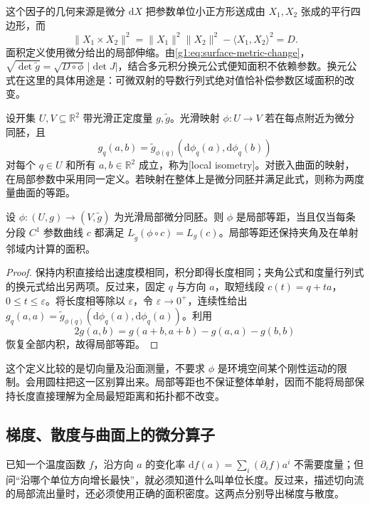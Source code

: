 这个因子的几何来源是微分 \(\mathrm{d}X\) 把参数单位小正方形送成由 \(X_1,X_2\) 张成的平行四边形，而
\[
	\|X_1\times X_2\|^2=\|X_1\|^2\|X_2\|^2-\langle X_1,X_2\rangle^2=D.
\]
面积定义使用微分给出的局部伸缩。由\eqref{g1:eq:surface-metric-change}，\(\sqrt{\det\widetilde g}=\sqrt{D\circ\phi}\,|\det J|\)，结合多元积分换元公式便知面积不依赖参数。换元公式在这里的具体用途是：可微双射的导数行列式绝对值恰补偿参数区域面积的改变。

\begin{definition}\label{g1:def:surface-local-isometry}
	设开集 \(U,V\subseteq\mathbb R^2\) 带光滑正定度量 \(g,\widetilde g\)。光滑映射 \(\phi:U\rightarrow V\) 若在每点附近为微分同胚，且
	\[
		g_q(a,b)=\widetilde g_{\phi(q)}(\mathrm{d}\phi_q(a),\mathrm{d}\phi_q(b))
	\]
	对每个 \(q\in U\) 和所有 \(a,b\in\mathbb R^2\) 成立，称为[local isometry]。对嵌入曲面的映射，在局部参数中采用同一定义。若映射在整体上是微分同胚并满足此式，则称为两度量曲面的等距。
\end{definition}

\begin{proposition}\label{g1:prop:local-isometry-length}
	设 \(\phi:(U,g)\rightarrow(V,\widetilde g)\) 为光滑局部微分同胚。则 \(\phi\) 是局部等距，当且仅当每条分段 \(C^1\) 参数曲线 \(c\) 都满足 \(L_{\widetilde g}(\phi\circ c)=L_g(c)\)。局部等距还保持夹角及在单射邻域内计算的面积。
\end{proposition}

\begin{proof}
	保持内积直接给出速度模相同，积分即得长度相同；夹角公式和度量行列式的换元式给出另两项。反过来，固定 \(q\) 与方向 \(a\)，取短线段 \(c(t)=q+ta\)，\(0\le t\le\varepsilon\)。将长度相等除以 \(\varepsilon\)，令 \(\varepsilon\to0^+\)，连续性给出 \(g_q(a,a)=\widetilde g_{\phi(q)}(\mathrm{d}\phi_q(a),\mathrm{d}\phi_q(a))\)。利用
	\[
		2g(a,b)=g(a+b,a+b)-g(a,a)-g(b,b)
	\]
	恢复全部内积，故得局部等距。
\end{proof}

这个定义比较的是切向量及沿面测量，不要求 \(\phi\) 是环境空间某个刚性运动的限制。会用圆柱把这一区别算出来。局部等距也不保证整体单射，因而不能将局部保持长度直接理解为全局最短距离和拓扑都不改变。

\subsection{梯度、散度与曲面上的微分算子}
\label{g1:subsec:0801:04}

已知一个温度函数 \(f\)，沿方向 \(a\) 的变化率 \(\mathrm{d}f(a)=\sum_i(\partial_i f)a^i\) 不需要度量；但问“沿哪个单位方向增长最快”，就必须知道什么叫单位长度。反过来，描述切向流的局部流出量时，还必须使用正确的面积密度。这两点分别导出梯度与散度。

